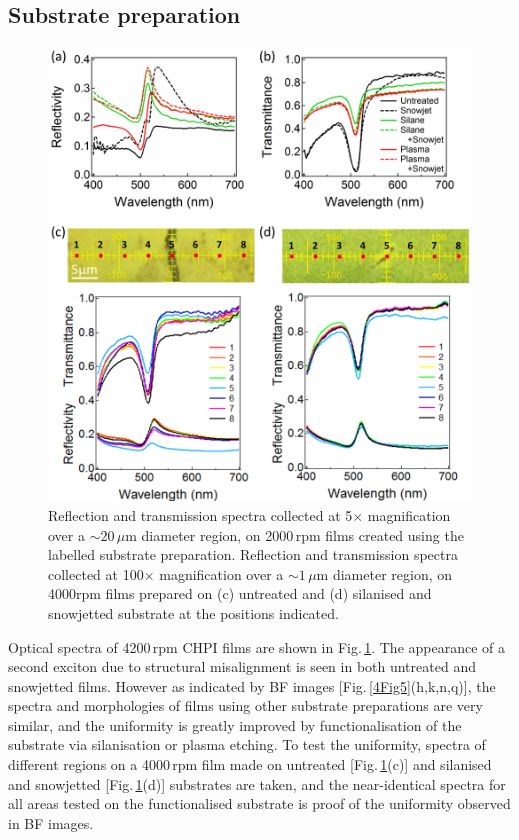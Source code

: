\subsection{Substrate preparation}
\begin{figure}[] 
\centering    
\includegraphics[width=\textwidth]{Fig7}
\caption{Reflection and transmission spectra collected at 5$\times$ magnification over a $\sim20\,\mu$m diameter region, on 2000\,rpm films created using the labelled substrate preparation. Reflection and transmission spectra collected at 100$\times$ magnification over a $\sim1\,\mu$m diameter region, on 4000rpm films prepared on (c) untreated and (d) silanised and snowjetted substrate at the positions indicated.}
\label{4Fig7}
\end{figure}
Optical spectra of 4200\,rpm CHPI films are shown in Fig.\,\ref{4Fig7}. The appearance of a second exciton due to structural misalignment is seen in both untreated and snowjetted films. However as indicated by BF images [Fig.\,\ref{4Fig5}(h,k,n,q)], the spectra and morphologies of films using other substrate preparations are very similar, and the uniformity is greatly improved by functionalisation of the substrate via silanisation or plasma etching. To test the uniformity, spectra of different regions on a 4000\,rpm film made on untreated [Fig.\,\ref{4Fig7}(c)] and silanised and snowjetted [Fig.\,\ref{4Fig7}(d)] substrates are taken, and the near-identical spectra for all areas tested on the functionalised substrate is proof of the uniformity observed in BF images.

